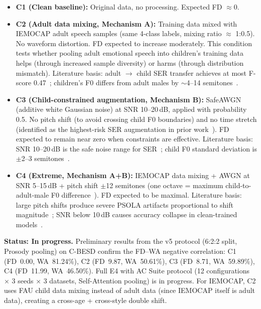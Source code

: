 \documentclass[11pt,a4paper]{article}
\begin{document}
\begin{itemize}
  \item \textbf{C1 (Clean baseline):} Original data, no processing. Expected
    FD $\approx 0$.
  \item \textbf{C2 (Adult data mixing, Mechanism A):} Training data mixed with
    IEMOCAP adult speech samples (same 4-class labels, mixing ratio $\approx$
    1:0.5). No waveform distortion. FD expected to increase moderately. This
    condition tests whether pooling adult emotional speech into children's
    training data helps (through increased sample diversity) or harms (through
    distribution mismatch). Literature basis: adult $\rightarrow$ child SER
    transfer achieves at most F-score 0.47~\cite{lesyk2024adult}; children's
    F0 differs from adult males by $\sim$4--14
    semitones~\cite{lee2007interspeech}.
  \item \textbf{C3 (Child-constrained augmentation, Mechanism B):} SafeAWGN
    (additive white Gaussian noise) at SNR 10--20\,dB, applied with probability
    0.5. No pitch shift (to avoid crossing child F0 boundaries) and no time
    stretch (identified as the highest-risk SER augmentation in prior
    work~\cite{tao2025entropy}). FD expected to remain near zero when
    constraints are effective. Literature basis: SNR 10--20\,dB is the safe
    noise range for SER~\cite{wu2023metricaug}; child F0 standard deviation is
    $\pm$2--3 semitones~\cite{tavares2010normative}.
  \item \textbf{C4 (Extreme, Mechanism A+B):} IEMOCAP data mixing + AWGN at
    SNR 5--15\,dB + pitch shift $\pm$12 semitones (one octave = maximum
    child-to-adult-male F0 difference~\cite{lee2007interspeech}). FD expected
    to be maximal. Literature basis: large pitch shifts produce severe PSOLA
    artifacts proportional to shift magnitude~\cite{morrison2024interspeech};
    SNR below 10\,dB causes accuracy collapse in clean-trained
    models~\cite{gwu2024snr}.
\end{itemize}

\textbf{Status: In progress.} Preliminary results from the v5 protocol
(6:2:2 split, Prosody pooling) on C-BESD confirm the FD--WA negative
correlation: C1 (FD~0.00, WA~81.24\%), C2 (FD~9.87, WA~50.61\%), C3 (FD~8.71,
WA~59.89\%), C4 (FD~11.99, WA~46.50\%). Full E4 with AC Suite protocol (12
configurations $\times$ 3 seeds $\times$ 3 datasets, Self-Attention pooling) is
in progress. For IEMOCAP, C2 uses FAU child data mixing instead of adult data
(since IEMOCAP itself is adult data), creating a cross-age + cross-style double
shift.
\end{document}
